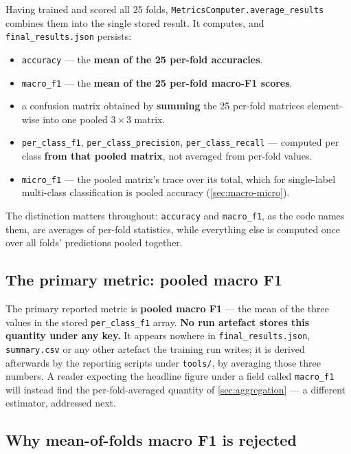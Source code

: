 Having trained and scored all 25 folds, \verb|MetricsComputer.average_results| combines them into the single stored result. It computes, and \texttt{final\_results.json} persists:

\begin{itemize}
	\item \texttt{accuracy} --- the \textbf{mean of the 25 per-fold accuracies}.
	\item \texttt{macro\_f1} --- the \textbf{mean of the 25 per-fold macro-F1 scores}.
	\item a confusion matrix obtained by \textbf{summing} the 25 per-fold matrices element-wise into one pooled $3\times3$ matrix.
	\item \texttt{per\_class\_f1}, \texttt{per\_class\_precision}, \texttt{per\_class\_recall} --- computed per class \textbf{from that pooled matrix}, not averaged from per-fold values.
	\item \texttt{micro\_f1} --- the pooled matrix's trace over its total, which for single-label multi-class classification is pooled accuracy (\autoref{sec:macro-micro}).
\end{itemize}

The distinction matters throughout: \texttt{accuracy} and \texttt{macro\_f1}, as the code names them, are averages of per-fold statistics, while everything else is computed once over all folds' predictions pooled together.

\subsection{The primary metric: pooled macro F1}
\label{sec:primary-metric}

The primary reported metric is \textbf{pooled macro F1} --- the mean of the three values in the stored \texttt{per\_class\_f1} array. \textbf{No run artefact stores this quantity under any key.} It appears nowhere in \texttt{final\_results.json}, \texttt{summary.csv} or any other artefact the training run writes; it is derived afterwards by the reporting scripts under \texttt{tools/}, by averaging those three numbers. A reader expecting the headline figure under a field called \texttt{macro\_f1} will instead find the per-fold-averaged quantity of \autoref{sec:aggregation} --- a different estimator, addressed next.

\subsection{Why mean-of-folds macro F1 is rejected}
\label{sec:mean-of-folds-rejected}

